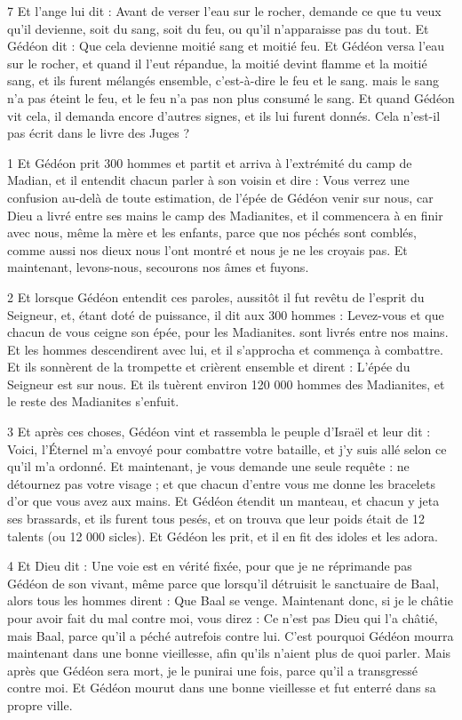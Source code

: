 \par 7 Et l'ange lui dit : Avant de verser l'eau sur le rocher, demande ce que tu veux qu'il devienne, soit du sang, soit du feu, ou qu'il n'apparaisse pas du tout. Et Gédéon dit : Que cela devienne moitié sang et moitié feu. Et Gédéon versa l'eau sur le rocher, et quand il l'eut répandue, la moitié devint flamme et la moitié sang, et ils furent mélangés ensemble, c'est-à-dire le feu et le sang. mais le sang n’a pas éteint le feu, et le feu n’a pas non plus consumé le sang. Et quand Gédéon vit cela, il demanda encore d'autres signes, et ils lui furent donnés. Cela n'est-il pas écrit dans le livre des Juges ?


\par 1 Et Gédéon prit 300 hommes et partit et arriva à l'extrémité du camp de Madian, et il entendit chacun parler à son voisin et dire : Vous verrez une confusion au-delà de toute estimation, de l'épée de Gédéon venir sur nous, car Dieu a livré entre ses mains le camp des Madianites, et il commencera à en finir avec nous, même la mère et les enfants, parce que nos péchés sont comblés, comme aussi nos dieux nous l'ont montré et nous je ne les croyais pas. Et maintenant, levons-nous, secourons nos âmes et fuyons.

\par 2 Et lorsque Gédéon entendit ces paroles, aussitôt il fut revêtu de l'esprit du Seigneur, et, étant doté de puissance, il dit aux 300 hommes : Levez-vous et que chacun de vous ceigne son épée, pour les Madianites. sont livrés entre nos mains. Et les hommes descendirent avec lui, et il s'approcha et commença à combattre. Et ils sonnèrent de la trompette et crièrent ensemble et dirent : L'épée du Seigneur est sur nous. Et ils tuèrent environ 120 000 hommes des Madianites, et le reste des Madianites s'enfuit.

\par 3 Et après ces choses, Gédéon vint et rassembla le peuple d'Israël et leur dit : Voici, l'Éternel m'a envoyé pour combattre votre bataille, et j'y suis allé selon ce qu'il m'a ordonné. Et maintenant, je vous demande une seule requête : ne détournez pas votre visage ; et que chacun d'entre vous me donne les bracelets d'or que vous avez aux mains. Et Gédéon étendit un manteau, et chacun y jeta ses brassards, et ils furent tous pesés, et on trouva que leur poids était de 12 talents (ou 12 000 sicles). Et Gédéon les prit, et il en fit des idoles et les adora.

\par 4 Et Dieu dit : Une voie est en vérité fixée, pour que je ne réprimande pas Gédéon de son vivant, même parce que lorsqu'il détruisit le sanctuaire de Baal, alors tous les hommes dirent : Que Baal se venge. Maintenant donc, si je le châtie pour avoir fait du mal contre moi, vous direz : Ce n'est pas Dieu qui l'a châtié, mais Baal, parce qu'il a péché autrefois contre lui. C'est pourquoi Gédéon mourra maintenant dans une bonne vieillesse, afin qu'ils n'aient plus de quoi parler. Mais après que Gédéon sera mort, je le punirai une fois, parce qu'il a transgressé contre moi. Et Gédéon mourut dans une bonne vieillesse et fut enterré dans sa propre ville.



